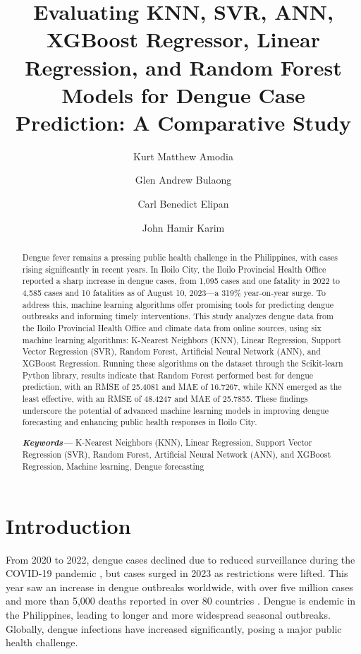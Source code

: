 \documentclass{article}
\title{\textbf{Evaluating KNN, SVR, ANN, XGBoost Regressor, Linear Regression, and Random Forest Models for Dengue Case Prediction: A Comparative Study}}
\author{
    Kurt Matthew Amodia \and 
    Glen Andrew Bulaong \and 
    Carl Benedict Elipan \and 
    John Hamir Karim
}
\date{}
\providecommand{\keywords}[1]
{
  \small	
  \textbf{\textit{Keywords---}} #1
}
\begin{document}
\maketitle

\begin{abstract}
Dengue fever remains a pressing public health challenge in the Philippines, with cases rising significantly in recent years. In Iloilo City, the Iloilo Provincial Health Office reported a sharp increase in dengue cases, from 1,095 cases and one fatality in 2022 to 4,585 cases and 10 fatalities as of August 10, 2023—a 319\% year-on-year surge. To address this, machine learning algorithms offer promising tools for predicting dengue outbreaks and informing timely interventions. This study analyzes dengue data from the Iloilo Provincial Health Office and climate data from online sources, using six machine learning algorithms: K-Nearest Neighbors (KNN), Linear Regression, Support Vector Regression (SVR), Random Forest, Artificial Neural Network (ANN), and XGBoost Regression. Running these algorithms on the dataset through the Scikit-learn Python library, results indicate that Random Forest performed best for dengue prediction, with an RMSE of 25.4081 and MAE of 16.7267, while KNN emerged as the least effective, with an RMSE of 48.4247 and MAE of 25.7855. These findings underscore the potential of advanced machine learning models in improving dengue forecasting and enhancing public health responses in Iloilo City.

\keywords{K-Nearest Neighbors (KNN), Linear Regression, Support Vector Regression (SVR), Random Forest, Artificial Neural Network (ANN), and XGBoost Regression, Machine learning, Dengue forecasting }
\end{abstract}

\section{Introduction}

From 2020 to 2022, dengue cases declined due to reduced surveillance during the COVID-19 pandemic \cite{WHO2023}, but cases surged in 2023 as restrictions were lifted. This year saw an increase in dengue outbreaks worldwide, with over five million cases and more than 5,000 deaths reported in over 80 countries \cite{bosano2023who}. Dengue is endemic in the Philippines, leading to longer and more widespread seasonal outbreaks. Globally, dengue infections have increased significantly, posing a major public health challenge. 
\end{document}
